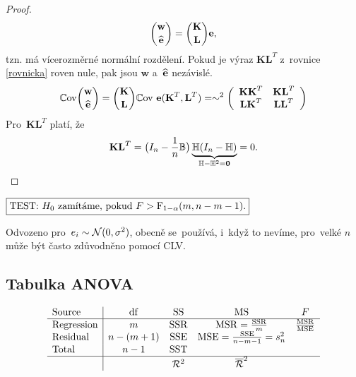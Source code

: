 \begin{proof}
 $$ \binom{\textbf{w}}{\heb} = \binom{\textbf{K}}{\textbf{L}} \eb, $$
 tzn. má vícerozměrné normální rozdělení. Pokud je výraz $\textbf{K}\textbf{L}^T$ z~rovnice \ref{rovnicka} roven nule, pak jsou $\textbf{w}$ a~$\heb$ nezávislé.
  \begin{equation}\label{rovnicka}
  \Cov\binom{\textbf{w}}{\heb} = \binom{\textbf{K}}{\textbf{L}}\Cov~\eb(\textbf{K}^T,\textbf{L}^T) = \sim^2 \left(\begin{array}{cc}
  \textbf{K}\textbf{K}^T&\textbf{K}\textbf{L}^T  \\
  \textbf{L}\textbf{K}^T & \textbf{L}\textbf{L}^T
  \end{array}
  \right)
  \end{equation}
  Pro~$\textbf{K}\textbf{L}^T$ platí, že
 $$ \textbf{K}\textbf{L}^T = \big(I_n-\frac{1}{n}\Bm \big)\underbrace{\Hm(I_n-\Hm)}_{\Hm-\Hm^2 = \nula} = 0. $$
\end{proof}

 $\test{F>\FF_{1-\alpha}(m,n-m-1)}$

 \begin{remark}
 	Odvozeno pro~$e_i\sim\NN(0,\sigma^2)$, obecně se~používá, i~když to nevíme, pro~velké $n$ může být často zdůvodněno pomocí CLV.
 \end{remark}
\subsection*{Tabulka ANOVA}
 $$ \begin{array}{l|cccc}
\text{Source}& \mathrm{df} & \mathrm{SS} & \mathrm{MS} & F \\\hline
\text{Regression} & m & \SSR & \MSR = \frac{\SSR}{m} & \frac{\MSR}{\MSE} \\
\text{Residual} & n-(m+1) & \SSE & \MSE = \frac{\SSE}{n-m-1} = s_n^2 &  \\
\text{Total} & n-1 & \SST &  &  \\\hline
&  & \RR^2 & \overline{\RR}^2 &
\end{array}
 $$
